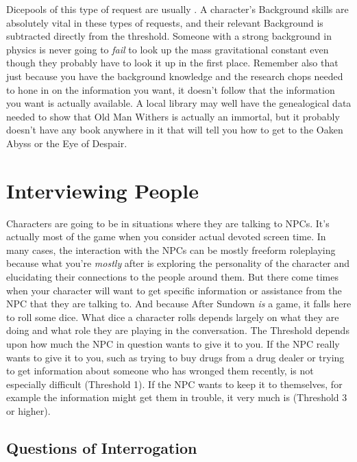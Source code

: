 Dicepools of this type of request are usually . A character's Background skills are absolutely vital in these types of requests, and their relevant Background is subtracted directly from the threshold. Someone with a strong background in physics is never going to \textit{fail} to look up the mass gravitational constant even though they probably have to look it up in the first place. Remember also that just because you have the background knowledge and the research chops needed to hone in on the information you want, it doesn't follow that the information you want is actually available. A local library may well have the genealogical data needed to show that Old Man Withers is actually an immortal, but it probably doesn't have any book anywhere in it that will tell you how to get to the Oaken Abyss or the Eye of Despair. 

\section{Interviewing People} 

Characters are going to be in situations where they are talking to NPCs. It's actually most of the game when you consider actual devoted screen time. In many cases, the interaction with the NPCs can be mostly freeform roleplaying because what you're \textit{mostly} after is exploring the personality of the character and elucidating their connections to the people around them. But there come times when your character will want to get specific information or assistance from the NPC that they are talking to. And because After Sundown \textit{is} a game, it falls here to roll some dice. What dice a character rolls depends largely on what they are doing and what role they are playing in the conversation. The Threshold depends upon how much the NPC in question wants to give it to you. If the NPC really wants to give it to you, such as trying to buy drugs from a drug dealer or trying to get information about someone who has wronged them recently, is not especially difficult (Threshold 1). If the NPC wants to keep it to themselves, for example the information might get them in trouble, it very much is (Threshold 3 or higher).

\subsection{Questions of Interrogation}

